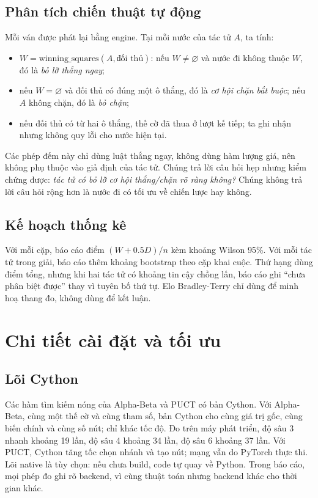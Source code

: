 \subsection{Phân tích chiến thuật tự động}
\label{sec:pp-phan-tich-chien-thuat}
Mỗi ván được phát lại bằng engine. Tại mỗi nước của tác tử $A$, ta tính:
\begin{itemize}
  \item $W=\mathrm{winning\_squares}(A,\text{đối thủ})$: nếu $W\neq\varnothing$ và nước đi không
        thuộc $W$, đó là \emph{bỏ lỡ thắng ngay};
  \item nếu $W=\varnothing$ và đối thủ có đúng một ô thắng, đó là \emph{cơ hội chặn bắt buộc};
        nếu $A$ không chặn, đó là \emph{bỏ chặn};
  \item nếu đối thủ có từ hai ô thắng, thế cờ đã thua ở lượt kế tiếp; ta ghi nhận nhưng không
        quy lỗi cho nước hiện tại.
\end{itemize}
Các phép đếm này chỉ dùng luật thắng ngay, không dùng hàm lượng giá, nên không phụ thuộc vào
giả định của tác tử. Chúng trả lời câu hỏi hẹp nhưng kiểm chứng được: \emph{tác tử có bỏ lỡ cơ
hội thắng/chặn rõ ràng không?} Chúng không trả lời câu hỏi rộng hơn là nước đi có tối ưu về
chiến lược hay không.

\subsection{Kế hoạch thống kê}
Với mỗi cặp, báo cáo điểm $(W+0.5D)/n$ kèm khoảng Wilson 95\%. Với mỗi tác tử trong giải, báo
cáo thêm khoảng bootstrap theo cặp khai cuộc. Thứ hạng dùng điểm tổng, nhưng khi hai tác tử có
khoảng tin cậy chồng lấn, báo cáo ghi ``chưa phân biệt được'' thay vì tuyên bố thứ tự. Elo
Bradley-Terry chỉ dùng để minh hoạ thang đo, không dùng để kết luận.

\section{Chi tiết cài đặt và tối ưu}
\label{sec:pp-cai-dat}
\subsection{Lõi Cython}
Các hàm tìm kiếm nóng của Alpha-Beta và PUCT có bản Cython. Với Alpha-Beta, cùng một thế cờ và
cùng tham số, bản Cython cho cùng giá trị gốc, cùng biến chính và cùng số nút; chỉ khác tốc độ.
Đo trên máy phát triển, độ sâu 3 nhanh khoảng 19 lần, độ sâu 4 khoảng 34 lần, độ sâu 6 khoảng
37 lần. Với PUCT, Cython tăng tốc chọn nhánh và tạo nút; mạng vẫn do PyTorch thực thi. Lõi
native là tùy chọn: nếu chưa build, code tự quay về Python. Trong báo cáo, mọi phép đo ghi rõ
backend, vì cùng thuật toán nhưng backend khác cho thời gian khác.

